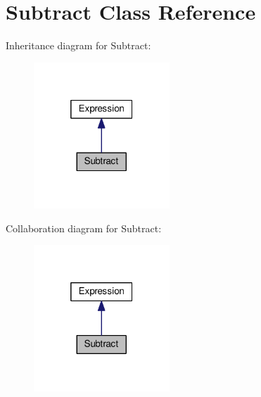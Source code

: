 \hypertarget{classSubtract}{}\section{Subtract Class Reference}
\label{classSubtract}


Inheritance diagram for Subtract\+:\nopagebreak
\begin{figure}[H]
\begin{center}
\leavevmode
\includegraphics[width=145pt]{classSubtract__inherit__graph}
\end{center}
\end{figure}


Collaboration diagram for Subtract\+:\nopagebreak
\begin{figure}[H]
\begin{center}
\leavevmode
\includegraphics[width=145pt]{classSubtract__coll__graph}
\end{center}
\end{figure}

